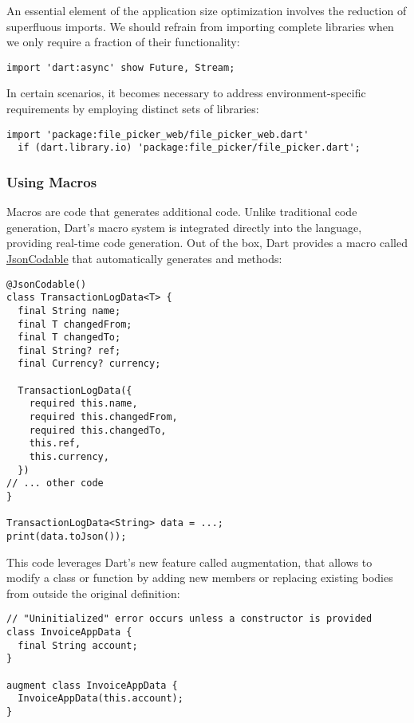 \noindent An essential element of the application size optimization involves the reduction of superfluous imports. 
We should refrain from importing complete libraries when we only require a fraction of their functionality:

\begin{lstlisting}
import 'dart:async' show Future, Stream;
\end{lstlisting}

\noindent In certain scenarios, it becomes necessary to address environment-specific requirements by employing distinct 
sets of libraries:

\begin{lstlisting}
import 'package:file_picker_web/file_picker_web.dart' 
  if (dart.library.io) 'package:file_picker/file_picker.dart';
\end{lstlisting}


\newpage
\subsubsection{Using Macros}

Macros are code that generates additional code. Unlike traditional code generation, Dart's macro system is integrated 
directly into the language, providing real-time code generation. Out of the box, Dart provides a macro called 
\href{https://dart.dev/go/json-codable}{JsonCodable} that automatically generates  and  methods:

\begin{lstlisting}
@JsonCodable()
class TransactionLogData<T> {
  final String name;
  final T changedFrom;
  final T changedTo;
  final String? ref;
  final Currency? currency;

  TransactionLogData({
    required this.name,
    required this.changedFrom,
    required this.changedTo,
    this.ref,
    this.currency,
  })
// ... other code
}

TransactionLogData<String> data = ...;
print(data.toJson());
\end{lstlisting}

This code leverages Dart's new feature called augmentation, that allows to modify a class or function by adding new 
members or replacing existing bodies from outside the original definition:

\begin{lstlisting}
// "Uninitialized" error occurs unless a constructor is provided
class InvoiceAppData {
  final String account; 
}

augment class InvoiceAppData {
  InvoiceAppData(this.account);
}
\end{lstlisting}


